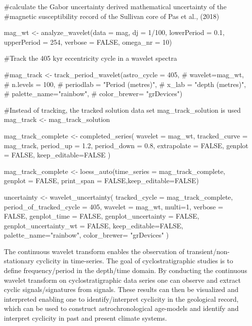 \documentclass[a4paper]{book}
\begin{document}
\begin{Examples}
\begin{ExampleCode}

#calculate the Gabor uncertainty derived mathematical uncertainty of the
#magnetic susceptibility record of the Sullivan core of Pas et al., (2018)

mag_wt <- analyze_wavelet(data = mag,
dj = 1/100,
lowerPeriod = 0.1,
upperPeriod = 254,
verbose = FALSE,
omega_nr = 10)

#Track the 405 kyr eccentricity cycle in a wavelet spectra

#mag_track <- track_period_wavelet(astro_cycle = 405,
#                                   wavelet=mag_wt,
#                                   n.levels = 100,
#                                   periodlab = "Period (metres)",
#                                   x_lab = "depth (metres)",
#                                palette_name="rainbow",
#                                color_brewer= "grDevices")

#Instead of tracking, the tracked solution data set mag_track_solution is used
mag_track <- mag_track_solution

mag_track_complete <- completed_series(
  wavelet = mag_wt,
  tracked_curve = mag_track,
  period_up = 1.2,
  period_down = 0.8,
  extrapolate = FALSE,
  genplot = FALSE,
  keep_editable=FALSE
)

mag_track_complete <- loess_auto(time_series = mag_track_complete,
 genplot = FALSE, print_span = FALSE,keep_editable=FALSE)

uncertainty <- wavelet_uncertainty(
  tracked_cycle = mag_track_complete,
  period_of_tracked_cycle = 405,
  wavelet = mag_wt,
  multi=1,
  verbose = FALSE,
  genplot_time = FALSE,
  genplot_uncertainty = FALSE,
  genplot_uncertainty_wt = FALSE,
  keep_editable=FALSE,
  palette_name="rainbow",
  color_brewer= "grDevices"
)

\end{ExampleCode}
\end{Examples}
%
\begin{Description}
The continuous wavelet transform enables the observation of
transient/non-stationary cyclicity in time-series. The goal of
cyclostratigraphic studies is to define frequency/period in the
depth/time domain. By conducting the continuous wavelet transform
on cyclostratigraphic data series one can observe and extract cyclic
signals/signatures from signals. These results can then be visualized
and interpreted enabling one to identify/interpret cyclicity in the
geological record, which can be used to construct astrochronological
age-models and identify and interpret cyclicity in past and present
climate systems.
\end{Description}
\end{document}
